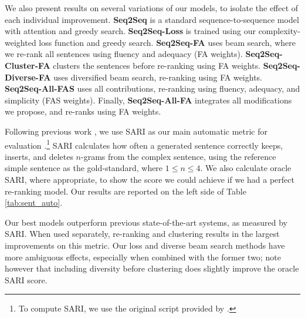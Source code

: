 \documentclass[thesis.tex]{subfiles}
\begin{document}
We also present results on several variations of our models, to isolate the effect of each individual improvement. \textbf{Seq2Seq} is a standard sequence-to-sequence model with attention and greedy search. \textbf{Seq2Seq-Loss} is trained using our complexity-weighted loss function and greedy search. \textbf{Seq2Seq-FA} uses beam search, where we re-rank all sentences using fluency and adequacy (FA weights). \textbf{Seq2Seq-Cluster-FA}  clusters the sentences before re-ranking using FA weights. \textbf{Seq2Seq-Diverse-FA} uses diversified beam search, re-ranking using FA weights. \textbf{Seq2Seq-All-FAS} uses all contributions, re-ranking using fluency, adequacy, and simplicity (FAS weights). Finally, \textbf{Seq2Seq-All-FA} integrates all modifications we propose, and re-ranks using FA weights.

Following previous work \citep{zhang2017sentence,zhao2018integrating}, we use SARI as our main automatic metric for evaluation \citep{xu2016optimizing}.\footnote{To compute SARI, we use the original script provided by \citep{xu2016optimizing}.} SARI calculates how often a generated sentence correctly keeps, inserts, and deletes $n$-grams from the complex sentence, using the reference simple sentence as the gold-standard, where $1 \leq n \leq 4$. We also calculate oracle SARI, where appropriate, to show the score we could achieve if we had a perfect re-ranking model. Our results are reported on the left side of Table \ref{tab:sent_auto}.

Our best models outperform previous state-of-the-art systems, as measured by SARI. When used separately, re-ranking and clustering results in the largest improvements on this metric. Our loss and diverse beam search methods have more ambiguous effects, especially when combined with the former two; note however that including diversity before clustering does slightly improve the oracle SARI score.
\end{document}
